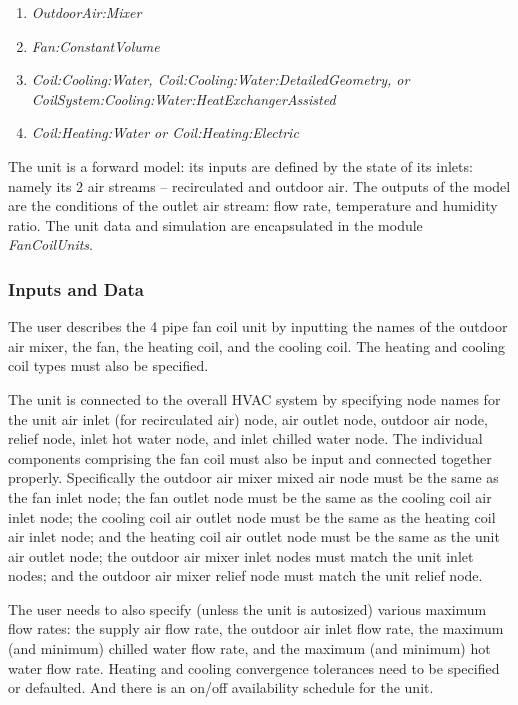 \begin{enumerate}
  \item \emph{OutdoorAir:Mixer}
  \item \emph{Fan:ConstantVolume}
  \item \emph{Coil:Cooling:Water, Coil:Cooling:Water:DetailedGeometry, or } \\ \emph{CoilSystem:Cooling:Water:HeatExchangerAssisted}
  \item \emph{Coil:Heating:Water or Coil:Heating:Electric}
\end{enumerate}

The unit is a forward model: its inputs are defined by the state of its inlets: namely its 2 air streams -- recirculated and outdoor air. The outputs of the model are the conditions of the outlet air stream: flow rate, temperature and humidity ratio. The unit data and simulation are encapsulated in the module \emph{FanCoilUnits}.

\subsubsection{Inputs and Data}\label{inputs-and-data-4}

The user describes the 4 pipe fan coil unit by inputting the names of the outdoor air mixer, the fan, the heating coil, and the cooling coil. The heating and cooling coil types must also be specified.

The unit is connected to the overall HVAC system by specifying node names for the unit air inlet (for recirculated air) node, air outlet node, outdoor air node, relief node, inlet hot water node, and inlet chilled water node. The individual components comprising the fan coil must also be input and connected together properly. Specifically the outdoor air mixer mixed air node must be the same as the fan inlet node; the fan outlet node must be the same as the cooling coil air inlet node; the cooling coil air outlet node must be the same as the heating coil air inlet node; and the heating coil air outlet node must be the same as the unit air outlet node; the outdoor air mixer inlet nodes must match the unit inlet nodes; and the outdoor air mixer relief node must match the unit relief node.

The user needs to also specify (unless the unit is autosized) various maximum flow rates: the supply air flow rate, the outdoor air inlet flow rate, the maximum (and minimum) chilled water flow rate, and the maximum (and minimum) hot water flow rate. Heating and cooling convergence tolerances need to be specified or defaulted. And there is an on/off availability schedule for the unit.

